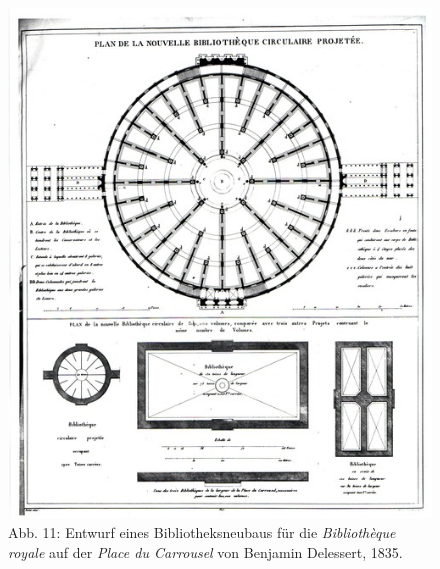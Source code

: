 \begin{figure}[htbp]
\centering
\includegraphics{img/wagner-11.jpg}
\caption{Abb. 11: Entwurf eines Bibliotheksneubaus für die
\emph{Bibliothèque royale} auf der \emph{Place du Carrousel} von
Benjamin Delessert, 1835.}
\end{figure}

